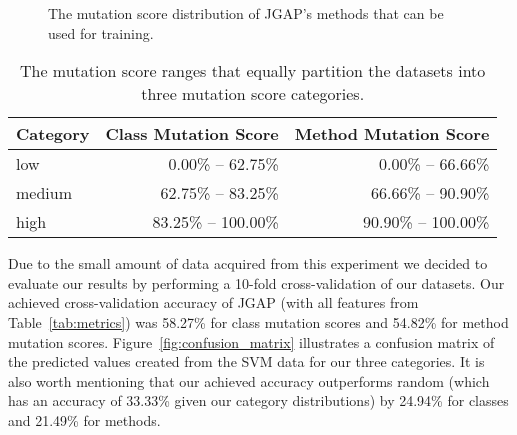 \begin{figure}[!t]
  \centering
  \caption{The mutation score distribution of JGAP's methods that can be used for training.}
  \label{fig:mutation_distributions_method}
\end{figure}

\begin{table}[!b]
  \centering
  \begin{tabular}{|l|r|r|}
    \hline
    \rowcolor[RGB]{169,196,223}
    \textbf{Category} & \textbf{Class Mutation Score} & \textbf{Method Mutation Score} \\
    \hline low & 0.00\% -- 62.75\% & 0.00\% -- 66.66\% \\
    \hline medium & 62.75\% -- 83.25\% & 66.66\% -- 90.90\% \\
    \hline high & 83.25\% -- 100.00\% & 90.90\% -- 100.00\% \\
    \hline
  \end{tabular}
  \caption{The mutation score ranges that equally partition the datasets into three mutation score categories.}
  \label{tab:results_details}
\end{table}

Due to the small amount of data acquired from this experiment we decided to evaluate our results by performing a 10-fold cross-validation of our datasets. Our achieved cross-validation accuracy of JGAP (with all features from Table~\ref{tab:metrics}) was 58.27\% for class mutation scores and 54.82\% for method mutation scores. Figure~\ref{fig:confusion_matrix} illustrates a confusion matrix of the predicted values created from the SVM data for our three categories. It is also worth mentioning that our achieved accuracy outperforms random (which has an accuracy of 33.33\% given our category distributions) by 24.94\% for classes and 21.49\% for methods.

